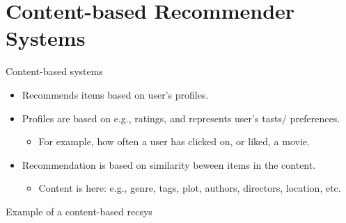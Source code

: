 \documentclass[handout]{beamer}
\begin{document}
\section[Content-based RecSys]{Content-based Recommender Systems}

\begin{frame}
	\begin{block}{Content-based systems}
		\begin{itemize}
			\item <1-> Recommends items based on user's profiles. 
			\item <2-> Profiles are based on e.g., ratings, and represents user's tasts/ preferences. 
			\begin{itemize}
				\item <3-> For example, how often a user has clicked on, or liked, a movie. 
			\end{itemize}
			\item <4-> Recommendation is based on \alert{similarity} beween items in the content.
			\begin{itemize}
				\item <5-> Content is here: e.g., genre, tags, plot, authors, directors, location, etc. 
			\end{itemize}
		\end{itemize}
	\end{block}
\end{frame}

\begin{frame}{Example of a content-based recsys}
\end{frame}
\end{document}
